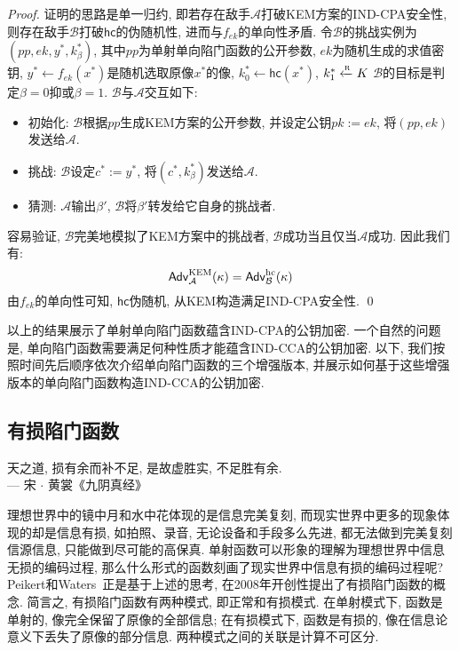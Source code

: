 \begin{proof}
证明的思路是单一归约, 即若存在敌手$\mathcal{A}$打破KEM方案的IND-CPA安全性, 
则存在敌手$\mathcal{B}$打破$\mathsf{hc}$的伪随机性, 进而与$f_{ek}$的单向性矛盾. 
令$\mathcal{B}$的挑战实例为$(pp, ek, y^*, k_\beta^*)$, 其中$pp$为单射单向陷门函数的公开参数, 
$ek$为随机生成的求值密钥, $y^* \leftarrow f_{ek}(x^*)$是随机选取原像$x^*$的像, 
$k_0^* \leftarrow \mathsf{hc}(x^*)$, $k_1^* \xleftarrow{\textup{\tiny R}} K$
$\mathcal{B}$的目标是判定$\beta=0$抑或$\beta=1$. $\mathcal{B}$与$\mathcal{A}$交互如下: 
\begin{itemize}
\item 初始化: $\mathcal{B}$根据$pp$生成KEM方案的公开参数, 并设定公钥$pk:=ek$, 将$(pp, ek)$发送给$\mathcal{A}$. 
\item 挑战: $\mathcal{B}$设定$c^*:=y^*$, 将$(c^*, k_\beta^*)$发送给$\mathcal{A}$. 
\item 猜测: $\mathcal{A}$输出$\beta'$, $\mathcal{B}$将$\beta'$转发给它自身的挑战者.
\end{itemize}
容易验证, $\mathcal{B}$完美地模拟了KEM方案中的挑战者, $\mathcal{B}$成功当且仅当$\mathcal{A}$成功. 因此我们有: 
\begin{equation*}
\mathsf{Adv}_\mathcal{A}^\text{KEM}(\kappa) = \mathsf{Adv}_\mathcal{B}^\text{hc}(\kappa)
\end{equation*}
由$f_{ek}$的单向性可知, $\mathsf{hc}$伪随机, 从KEM构造满足IND-CPA安全性. \qed
\end{proof}

以上的结果展示了单射单向陷门函数蕴含IND-CPA的公钥加密. 
一个自然的问题是, 单向陷门函数需要满足何种性质才能蕴含IND-CCA的公钥加密. 
以下, 我们按照时间先后顺序依次介绍单向陷门函数的三个增强版本, 并展示如何基于这些增强版本的单向陷门函数构造IND-CCA的公钥加密. 

\subsection{有损陷门函数}
\begin{center}
    天之道, 损有余而补不足, 是故虚胜实, 不足胜有余. \\
                \hfill --- 宋 $\cdot$ 黄裳《九阴真经》
\end{center}

理想世界中的镜中月和水中花体现的是信息完美复刻, 而现实世界中更多的现象体现的却是信息有损, 如拍照、录音, 无论设备和手段多么先进, 
都无法做到完美复刻信源信息, 只能做到尽可能的高保真. 
单射函数可以形象的理解为理想世界中信息无损的编码过程, 那么什么形式的函数刻画了现实世界中信息有损的编码过程呢? 
Peikert和Waters~\cite{PW-STOC-2008}正是基于上述的思考, 在2008年开创性提出了有损陷门函数的概念. 
简言之, 有损陷门函数有两种模式, 即正常和有损模式. 
在单射模式下, 函数是单射的, 像完全保留了原像的全部信息; 
在有损模式下, 函数是有损的, 像在信息论意义下丢失了原像的部分信息. 两种模式之间的关联是计算不可区分. 

